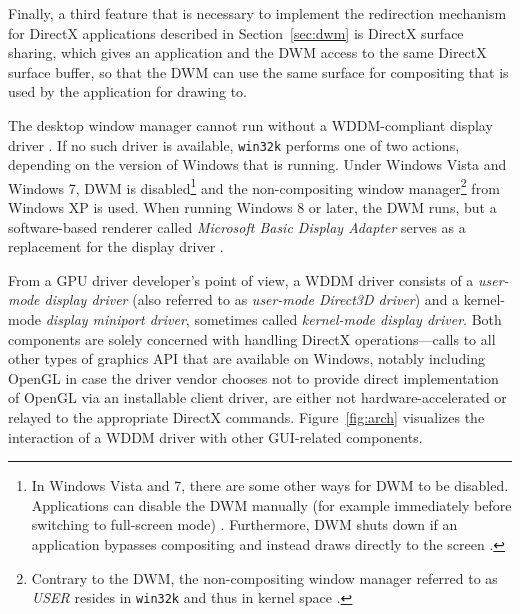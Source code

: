 			Finally, a third feature that is necessary to implement the redirection
			mechanism for DirectX applications described in Section~\ref{sec:dwm}
			is DirectX surface sharing, which gives an application and the DWM
			access to the same DirectX surface buffer, so that the DWM can use the
			same surface for compositing that is used by the application for
			drawing to. \cite{dwmredirect}

			The desktop window manager cannot run without a WDDM-compliant
			display driver \cite{dwmwddm}. If no such driver is available,
			\texttt{win32k} \cite{probertwin32k} performs one of two actions, depending on the version of Windows that
			is running. Under Windows Vista and Windows 7, DWM is
			disabled\footnote{In Windows Vista and 7, there are some other ways for
			DWM to be disabled. Applications can disable the DWM manually (for
			example immediately before switching to full-screen mode)
			\cite{disabledwm}. Furthermore, DWM shuts down if an application
			bypasses compositing and instead draws directly to the screen
			\cite{dwmredirect}.}
			and the non-compositing window manager\footnote{Contrary to the DWM,
			the non-compositing window manager referred to as \textit{USER} resides
			in \texttt{win32k} and thus in kernel space \cite{probertwin32k}.}
			from Windows XP is used. When running Windows 8 or later,
			the DWM runs, but a software-based renderer called
			\textit{Microsoft Basic Display Adapter} serves as a replacement
			for the display driver \cite{dwmalwayson}.

			From a GPU driver developer's point of view, a WDDM driver consists
			of a \textit{user-mode display driver} (also referred to as
			\textit{user-mode Direct3D driver}) and a kernel-mode
			\textit{display miniport driver}, sometimes called \textit{kernel-mode
			display driver}. Both components are solely concerned with handling
			DirectX operations---calls to all other types of graphics API that
			are available on Windows, notably including OpenGL in case the driver
			vendor chooses not to provide direct implementation of OpenGL via
			an installable client driver, are either not
			hardware-accelerated or relayed to the appropriate DirectX commands.
			Figure~\ref{fig:arch} visualizes the interaction of a WDDM driver with
			other GUI-related components.
			\cite{wddmarch,d2dvsgdi}

